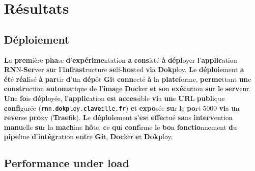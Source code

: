 \documentclass{rapportClass} %
\begin{document}
\chapter{Résultats}

\section{Déploiement}

\textbf{L}a \textbf{prem}ière \textbf{pha}se \textbf{d}’\textbf{expérime}ntation \textbf{a} \textbf{cons}isté \textbf{à} \textbf{dépl}oyer \textbf{l}’\textbf{applic}ation
\textbf{RN}N-\textbf{Ser}ver \textbf{su}r \textbf{l}’\textbf{infrast}ructure \textbf{se}lf-\textbf{hos}ted \textbf{vi}a \textbf{Dokp}loy.
\textbf{L}e \textbf{déploi}ement \textbf{a} \textbf{ét}é \textbf{réal}isé \textbf{à} \textbf{par}tir \textbf{d}’\textbf{u}n \textbf{dép}ôt \textbf{Gi}t \textbf{conn}ecté \textbf{à} \textbf{l}a
\textbf{plate}forme, \textbf{perme}ttant \textbf{un}e \textbf{constr}uction \textbf{automa}tique \textbf{d}e \textbf{l}’\textbf{ima}ge \textbf{Doc}ker
\textbf{e}t \textbf{so}n \textbf{exécu}tion \textbf{su}r \textbf{l}e \textbf{serv}eur.
\textbf{Un}e \textbf{fo}is \textbf{dépl}oyée, \textbf{l}’\textbf{applic}ation \textbf{es}t \textbf{acces}sible \textbf{vi}a \textbf{un}e \textbf{UR}L \textbf{publ}ique
\textbf{confi}gurée (\texttt{\textbf{rn}n.\textbf{dokp}loy.\textbf{clave}ille.\textbf{f}r}) \textbf{e}t \textbf{expo}sée \textbf{su}r \textbf{l}e \textbf{po}rt
5000 \textbf{vi}a \textbf{u}n \textbf{reve}rse \textbf{pro}xy (\textbf{Trae}fik).
\textbf{L}e \textbf{déploi}ement \textbf{s}’\textbf{es}t \textbf{effe}ctué \textbf{sa}ns \textbf{interv}ention \textbf{manu}elle \textbf{su}r \textbf{l}a
\textbf{mach}ine \textbf{hô}te, \textbf{c}e \textbf{qu}i \textbf{conf}irme \textbf{l}e \textbf{bo}n \textbf{fonctio}nnement \textbf{d}u \textbf{pipe}line
\textbf{d}’\textbf{intégr}ation \textbf{ent}re \textbf{Gi}t, \textbf{Doc}ker \textbf{e}t \textbf{Dokp}loy.

\section{Performance under load}
\end{document}
